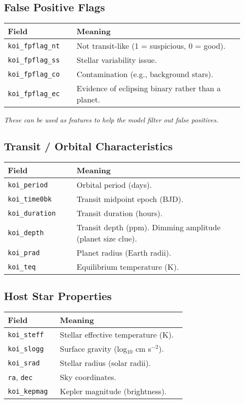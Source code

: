 \documentclass{article}
\begin{document}
\subsection*{False Positive Flags}
\begin{tabular}{@{}p{0.28\linewidth} p{0.68\linewidth}@{}}
\toprule
\textbf{Field} & \textbf{Meaning} \\ \midrule
\texttt{koi\_fpflag\_nt} & Not transit-like (1 = suspicious, 0 = good). \\
\texttt{koi\_fpflag\_ss} & Stellar variability issue. \\
\texttt{koi\_fpflag\_co} & Contamination (e.g., background stars). \\
\texttt{koi\_fpflag\_ec} & Evidence of eclipsing binary rather than a planet. \\
\bottomrule
\end{tabular}

\medskip
\noindent\emph{These can be used as features to help the model filter out false positives.}

\subsection*{Transit / Orbital Characteristics}
\begin{tabular}{@{}p{0.28\linewidth} p{0.68\linewidth}@{}}
\toprule
\textbf{Field} & \textbf{Meaning} \\ \midrule
\texttt{koi\_period} & Orbital period (days). \\
\texttt{koi\_time0bk} & Transit midpoint epoch (BJD). \\
\texttt{koi\_duration} & Transit duration (hours). \\
\texttt{koi\_depth} & Transit depth (ppm). Dimming amplitude (planet size clue). \\
\texttt{koi\_prad} & Planet radius (Earth radii). \\
\texttt{koi\_teq} & Equilibrium temperature (K). \\
\bottomrule
\end{tabular}

\subsection*{Host Star Properties}
\begin{tabular}{@{}p{0.28\linewidth} p{0.68\linewidth}@{}}
\toprule
\textbf{Field} & \textbf{Meaning} \\ \midrule
\texttt{koi\_steff} & Stellar effective temperature (K). \\
\texttt{koi\_slogg} & Surface gravity (log$_{10}$ cm s$^{-2}$). \\
\texttt{koi\_srad} & Stellar radius (solar radii). \\
\texttt{ra}, \texttt{dec} & Sky coordinates. \\
\texttt{koi\_kepmag} & Kepler magnitude (brightness). \\
\bottomrule
\end{tabular}
\end{document}
